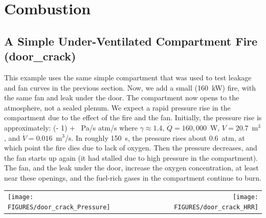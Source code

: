 \documentclass[11pt]{book}
\begin{document}
\clearpage





\section{Combustion}


\subsection{A Simple Under-Ventilated Compartment Fire ({\bf door\_crack}) }

This example uses the same simple compartment that was used to test leakage and fan curves in the previous section. Now, we add a small (160~kW) fire, with the same
fan and leak under the door. The compartment now opens to the atmosphere, not a sealed plenum. We expect a rapid pressure rise in the compartment due to the effect of the
fire and the fan. Initially, the pressure rise is approximately:
\be {} \approx (\gamma - 1) \;  + \gamma \,  \;   \; \hbox{Pa/s}   \; \hbox{atm/s}   \ee
where $\gamma \approx 1.4$, $\dot{Q}=160,000$~W, $V=20.7$~m$^3$, and $\dot{V}=0.016$~m$^3$/s. In roughly 150~s, the pressure rises about 0.6~atm, at which point the fire
dies due to lack of oxygen. Then the pressure decreases, and the fan starts up again (it had stalled due to high pressure in the compartment). The fan, and the leak under the
door, increase the oxygen concentration, at least near these openings, and the fuel-rich gases in the compartment continue to burn.

\vspace{0.1in}
\noindent
\begin{tabular*}{\textwidth}{lr}
\texttt{[image: FIGURES/door\_crack\_Pressure]} &
\texttt{[image: FIGURES/door\_crack\_HRR]}
\end{tabular*}
\end{document}
